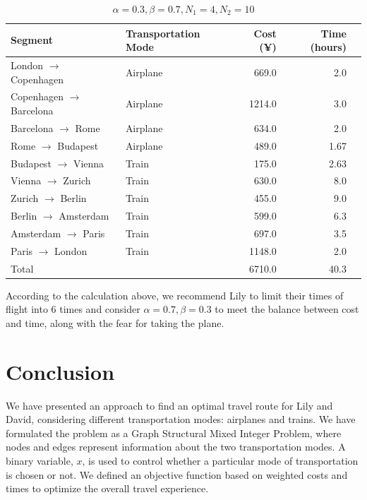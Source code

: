 \documentclass{article}
\begin{document}
\begin{table}[!ht]
  \centering
  \begin{tabular}{llrrr}
    \toprule
    Segment                          & Transportation Mode & Cost (¥) & Time (hours) \\
    \midrule
    London $\rightarrow$  Copenhagen & Airplane            & 669.0    & 2.0          \\
    Copenhagen $\rightarrow$  Barcelona & Airplane          & 1214.0   & 3.0          \\
    Barcelona $\rightarrow$  Rome     & Airplane            & 634.0    & 2.0          \\
    Rome $\rightarrow$  Budapest     & Airplane            & 489.0    & 1.67         \\
    Budapest $\rightarrow$  Vienna    & Train               & 175.0    & 2.63         \\
    Vienna $\rightarrow$  Zurich      & Train               & 630.0    & 8.0          \\
    Zurich $\rightarrow$  Berlin      & Train               & 455.0    & 9.0          \\
    Berlin $\rightarrow$  Amsterdam   & Train               & 599.0    & 6.3          \\
    Amsterdam $\rightarrow$  Paris    & Train               & 697.0    & 3.5          \\
    Paris $\rightarrow$  London       & Train               & 1148.0   & 2.0          \\
    \midrule
    Total                            &                     & 6710.0   & 40.3         \\
    \bottomrule
  \end{tabular}
  \caption{$\alpha=0.3, \beta=0.7, N_1=4, N_2=10$}%
  \label{tab:alpha0.3beta0.7N14}
\end{table}

According to the calculation above, we recommend Lily to limit their times of flight into 6 times and consider $\alpha = 0.7, \beta = 0.3$ to meet the balance between cost and time, along with the fear for taking the plane.

\section{Conclusion}
We have presented an approach to find an optimal travel route for Lily and David, considering different transportation modes: airplanes and trains. We have formulated the problem as a Graph Structural Mixed Integer Problem, where nodes and edges represent information about the two transportation modes. A binary variable, $x$, is used to control whether a particular mode of transportation is chosen or not. We defined an objective function based on weighted costs and times to optimize the overall travel experience.
\end{document}
